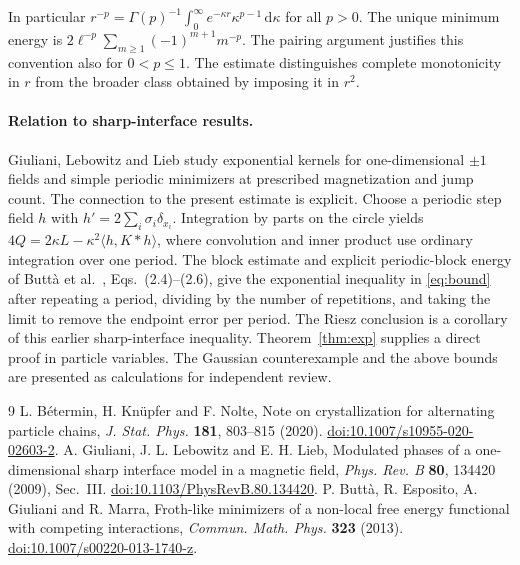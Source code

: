 \documentclass[11pt]{article}
\newcommand{\dd}{\,\mathrm d}
\begin{document}
In particular $r^{-p}=\Gamma(p)^{-1}\int_0^\infty e^{-\kappa r}\kappa^{p-1}\dd\kappa$ for all $p>0$. The unique minimum energy is $2\ell^{-p}\sum_{m\ge1}(-1)^{m+1}m^{-p}$. The pairing argument justifies this convention also for $0<p\le1$. The estimate distinguishes complete monotonicity in $r$ from the broader class obtained by imposing it in $r^2$.

\paragraph{Relation to sharp-interface results.}
Giuliani, Lebowitz and Lieb \cite{GLL} study exponential kernels for one-dimensional $\pm1$ fields and simple periodic minimizers at prescribed magnetization and jump count. The connection to the present estimate is explicit. Choose a periodic step field $h$ with $h'=2\sum_i\sigma_i\delta_{x_i}$. Integration by parts on the circle yields $4Q=2\kappa L-\kappa^2\langle h,K*h\rangle$, where convolution and inner product use ordinary integration over one period. The block estimate and explicit periodic-block energy of Buttà et al.~\cite{BEGM}, Eqs.~(2.4)--(2.6), give the exponential inequality in \eqref{eq:bound} after repeating a period, dividing by the number of repetitions, and taking the limit to remove the endpoint error per period. The Riesz conclusion is a corollary of this earlier sharp-interface inequality. Theorem~\ref{thm:exp} supplies a direct proof in particle variables. The Gaussian counterexample and the above bounds are presented as calculations for independent review.

\begin{thebibliography}{9}
 L. B\'etermin, H. Kn\"upfer and F. Nolte, Note on crystallization for alternating particle chains, \emph{J. Stat. Phys.} \textbf{181}, 803--815 (2020). \href{https://doi.org/10.1007/s10955-020-02603-2}{doi:10.1007/s10955-020-02603-2}.
 A. Giuliani, J. L. Lebowitz and E. H. Lieb, Modulated phases of a one-dimensional sharp interface model in a magnetic field, \emph{Phys. Rev. B} \textbf{80}, 134420 (2009), Sec.~III. \href{https://doi.org/10.1103/PhysRevB.80.134420}{doi:10.1103/PhysRevB.80.134420}.
 P. Buttà, R. Esposito, A. Giuliani and R. Marra, Froth-like minimizers of a non-local free energy functional with competing interactions, \emph{Commun. Math. Phys.} \textbf{323} (2013). \href{https://doi.org/10.1007/s00220-013-1740-z}{doi:10.1007/s00220-013-1740-z}.
\end{thebibliography}
\end{document}
